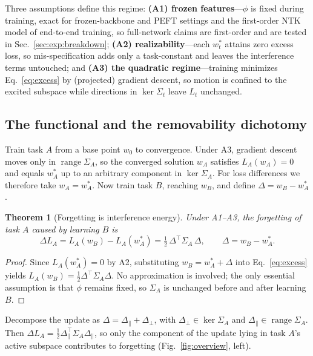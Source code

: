 \documentclass[10pt,a4paper]{article}
\theoremstyle{plain}
\newtheorem{theorem}{Theorem}
\theoremstyle{definition}
\newcommand{\Sig}{\Sigma}
\newcommand{\Del}{\Delta}
\DeclareMathOperator{\range}{range}
\begin{document}
Three
assumptions define this regime: \textbf{(A1) frozen features}---$\phi$ is fixed during training,
exact for frozen-backbone and PEFT settings and the first-order NTK \cite{jacot2018} model of
end-to-end training, so full-network claims are first-order and are tested in
Sec.~\ref{sec:exp:breakdown}; \textbf{(A2) realizability}---each $w_t^\ast$ attains zero
excess loss, so mis-specification adds only a task-constant and leaves the interference terms
untouched; and \textbf{(A3) the quadratic regime}---training minimizes Eq.~\eqref{eq:excess}
by (projected) gradient descent, so motion is confined to the excited subspace while
directions in $\ker\Sig_t$ leave $L_t$ unchanged.

\subsection{The functional and the removability dichotomy}
\label{sec:theory:functional}
Train task $A$ from a base point $w_0$ to convergence. Under A3, gradient descent
moves only in $\range\Sig_A$, so the converged solution $w_A$ satisfies $L_A(w_A)=0$
and equals $w_A^\ast$ up to an arbitrary component in $\ker\Sig_A$. For loss
differences we therefore take $w_A=w_A^\ast$. Now train task $B$, reaching $w_B$, and
define $\Del=w_B-w_A^\ast$.

\begin{theorem}[Forgetting is interference energy]
\label{thm:functional}
Under A1--A3, the forgetting of task $A$ caused by learning $B$ is
\begin{equation}
\Del L_A=L_A(w_B)-L_A(w_A^\ast)=\tfrac12\,\Del^\top\Sig_A\,\Del,
\qquad \Del=w_B-w_A^\ast.
\label{eq:functional}
\end{equation}
\end{theorem}
\begin{proof}
Since $L_A(w_A^\ast)=0$ by A2, substituting $w_B=w_A^\ast+\Del$ into
Eq.~\eqref{eq:excess} yields $L_A(w_B)=\tfrac12\Del^\top\Sig_A\Del$. No approximation
is involved; the only essential assumption is that $\phi$ remains fixed, so $\Sig_A$
is unchanged before and after learning $B$.
\end{proof}

\noindent Decompose the update as $\Del=\Del_\parallel+\Del_\perp$, with
$\Del_\perp\in\ker\Sig_A$ and $\Del_\parallel\in\range\Sig_A$. Then $\Del L_A=
\tfrac12\Del_\parallel^\top\Sig_A\Del_\parallel$, so only the component of the update
lying in task $A$'s active subspace contributes to forgetting
(Fig.~\ref{fig:overview}, left).
\end{document}
